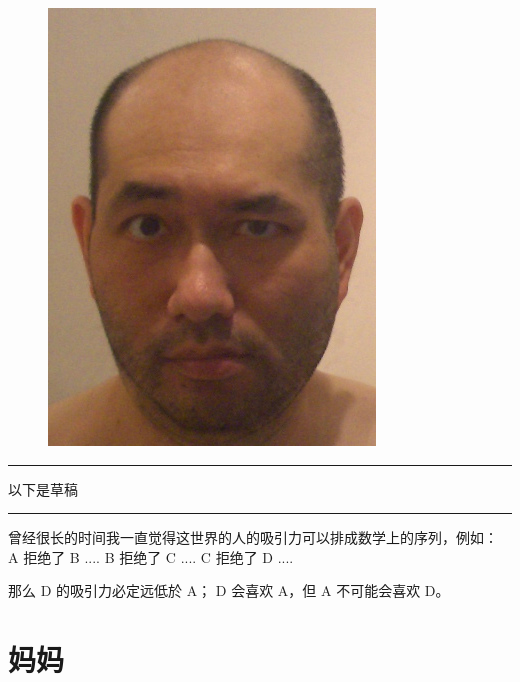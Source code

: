 \documentclass[12pt]{report}
\newcommand{\tab}{\hspace*{1cm}}
\newcommand*\todo{\begin{center}\color{red}  \rule{5cm}{0.5pt} 以下是草稿\, \rule{5cm}{0.5pt} \end{center}}
\begin{document}
\begin{figure}[H]
\centering
\includegraphics[scale=0.6]{2015June.jpg}
\end{figure}

\todo

曾经很长的时间我一直觉得这世界的人的吸引力可以排成数学上的序列，例如： \\
\tab \tab \tab A 拒绝了 B .... B 拒绝了 C .... C 拒绝了 D .... 
\begin{center}
\end{center}
那么 D 的吸引力必定远低於 A； D 会喜欢 A，但 A 不可能会喜欢 D。

\begin{center}
\end{center}

\chapter{妈妈}
\end{document}

